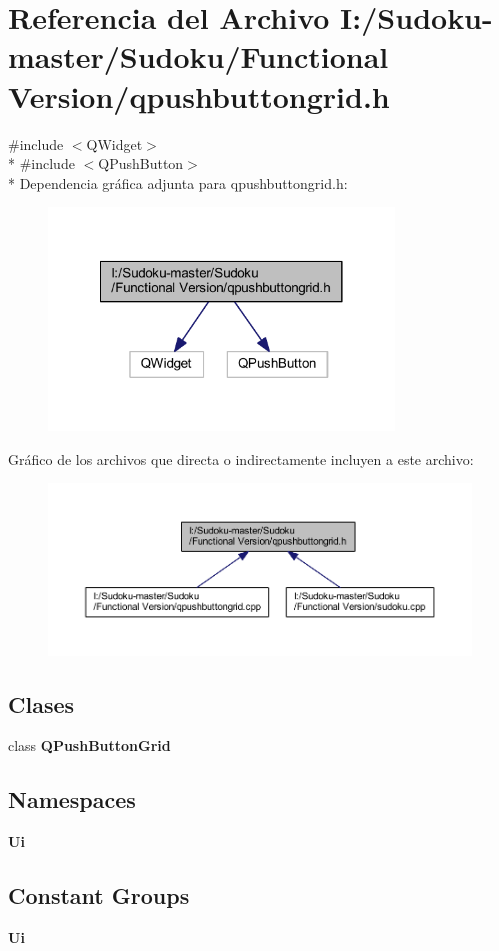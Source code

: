 \section{Referencia del Archivo I\-:/\-Sudoku-\/master/\-Sudoku/\-Functional Version/qpushbuttongrid.h}
\label{qpushbuttongrid_8h}
{\ttfamily \#include $<$Q\-Widget$>$}\\*
{\ttfamily \#include $<$Q\-Push\-Button$>$}\\*
Dependencia gráfica adjunta para qpushbuttongrid.\-h\-:
\nopagebreak
\begin{figure}[H]
\begin{center}
\leavevmode
\includegraphics[width=260pt]{qpushbuttongrid_8h__incl}
\end{center}
\end{figure}
Gráfico de los archivos que directa o indirectamente incluyen a este archivo\-:
\nopagebreak
\begin{figure}[H]
\begin{center}
\leavevmode
\includegraphics[width=350pt]{qpushbuttongrid_8h__dep__incl}
\end{center}
\end{figure}
\subsection*{Clases}
\begin{DoxyCompactItemize}
\item 
class {\bf Q\-Push\-Button\-Grid}
\end{DoxyCompactItemize}
\subsection*{Namespaces}
\begin{DoxyCompactItemize}
\item 
{\bf Ui}
\end{DoxyCompactItemize}
\subsection*{Constant Groups}
\begin{DoxyCompactItemize}
\item 
{\bf Ui}
\end{DoxyCompactItemize}
